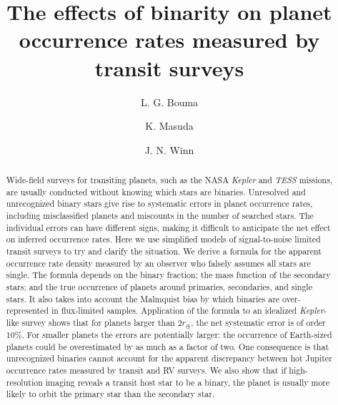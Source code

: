 \documentclass[12pt,modern]{aastex61}
\begin{document}
    
\title{ The effects of binarity on planet occurrence rates measured by
transit surveys}
%
%
\author{L. G. Bouma}
\author{K. Masuda}
\author{J. N. Winn}
%
%
\begin{abstract}
%

Wide-field surveys for transiting planets, such as the NASA
{\it Kepler} and {\it TESS} missions, are usually conducted without
knowing which stars are binaries. Unresolved and unrecognized binary
stars give rise to systematic errors in planet occurrence rates,
including misclassified planets and miscounts in the number of
searched stars. The individual errors can have different signs,
making it difficult to anticipate the net effect on inferred
occurrence rates. Here we use simplified models of signal-to-noise
limited transit surveys to try and clarify the situation. We derive
a formula for the apparent occurrence rate density measured by an
observer who falsely assumes all stars are single. The formula
depends on the binary fraction; the mass function of the secondary
stars; and the true occurrence of planets around primaries,
secondaries, and single stars. It also takes into account the
Malmquist bias by which binaries are over-represented in
flux-limited samples. Application of the formula to an idealized
{\it Kepler}-like survey shows that for planets larger than
$2r_\oplus$, the net systematic error is of order 10\%. For smaller
planets the errors are potentially larger: the occurrence of
Earth-sized planets could be overestimated by as much as a factor of
two. One consequence is that unrecognized binaries cannot account
for the apparent discrepancy between hot Jupiter occurrence
rates measured by transit and RV surveys. We also show that if
high-resolution imaging reveals a transit host star to be a binary,
the planet is usually more likely to orbit the primary star than the
secondary star.
%
\end{abstract}
%
%
%

\end{document}
